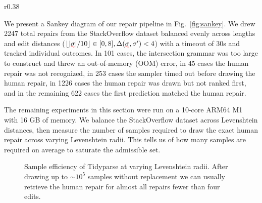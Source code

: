 \documentclass[sigplan,acmsmall,nonacm,screen]{acmart}\settopmatter{printfolios=false,printccs=false,printacmref=false}
\begin{document}
  \begin{wrapfigure}{r}{0.38\textwidth}
    \vspace{-1.2cm}
    \hspace{-0.8cm}
    \resizebox{.47\textwidth}{!}{}
    \vspace{-1.4cm}
    \caption{Outcomes in the repair pipeline.}
    \label{fig:sankey}
  \end{wrapfigure}


  We present a Sankey diagram of our repair pipeline in Fig.~\ref{fig:sankey}. We drew 2247 total repairs from the StackOverflow dataset balanced evenly across lengths and edit distances ($\lfloor|\err\sigma| / 10\rfloor \in [0, 8], \Delta(\err\sigma, \sigma') < 4$) with a timeout of 30s and tracked individual outcomes. In 101 cases, the intersection grammar was too large to construct and threw an out-of-memory (OOM) error, in 45 cases the human repair was not recognized, in 253 cases the sampler timed out before drawing the human repair, in 1226 cases the human repair was drawn but not ranked first, and in the remaining 622 cases the first prediction matched the human repair.

  \clearpage The remaining experiments in this section were run on a 10-core ARM64 M1 with 16 GB of memory. We balance the StackOverflow dataset across Levenshtein distances, then measure the number of samples required to draw the exact human repair across varying Levenshtein radii. This tells us of how many samples are required on average to saturate the admissible set.

  \begin{figure}[h!]
    
    \caption{Sample efficiency of Tidyparse at varying Levenshtein radii. After drawing up to $\sim10^5$ samples without replacement we can usually retrieve the human repair for almost all repairs fewer than four edits.}\label{fig:sample_efficiency}
  \end{figure}

\end{document}
